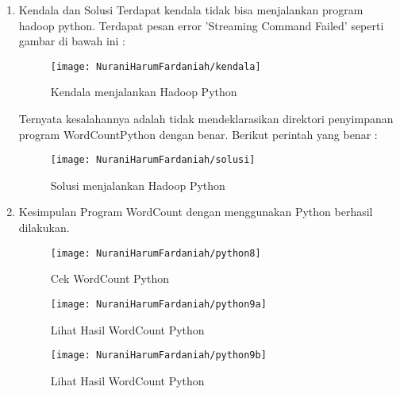 \begin{enumerate}
\item Kendala dan Solusi
\newline Terdapat kendala tidak bisa menjalankan program hadoop python. Terdapat pesan error 'Streaming Command Failed' seperti gambar di bawah ini :

\begin{figure}[!ht]
\texttt{[image: NuraniHarumFardaniah/kendala]}
\caption{Kendala menjalankan Hadoop Python}
\label{gam:perkuliahan-25-11}
\end{figure}

Ternyata kesalahannya adalah tidak mendeklarasikan direktori penyimpanan program WordCountPython dengan benar. Berikut perintah yang benar :

\begin{figure}[!ht]
\texttt{[image: NuraniHarumFardaniah/solusi]}
\caption{Solusi menjalankan Hadoop Python}
\label{gam:perkuliahan-25-11}
\end{figure}

\item Kesimpulan
\newline Program WordCount dengan menggunakan Python berhasil dilakukan.

\begin{figure}[!ht]
\texttt{[image: NuraniHarumFardaniah/python8]}
\caption{Cek WordCount Python}
\label{gam:perkuliahan-25-11}
\end{figure}

\begin{figure}[!ht]
\texttt{[image: NuraniHarumFardaniah/python9a]}
\caption{Lihat Hasil WordCount Python}
\label{gam:perkuliahan-25-11}
\end{figure}

\begin{figure}[!ht]
\texttt{[image: NuraniHarumFardaniah/python9b]}
\caption{Lihat Hasil WordCount Python}
\label{gam:perkuliahan-25-11}
\end{figure}
\end{enumerate}

